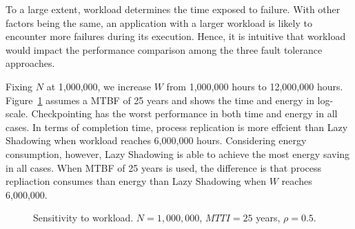 To a large extent, workload determines the time exposed to failure. With other factors being the same, an application with a larger workload is likely to encounter more failures during its execution. Hence, it is intuitive that workload would impact the performance comparison among the three fault tolerance approaches. 

Fixing $N$ at 1,000,000, we increase $W$ from 1,000,000 hours to 12,000,000 hours. Figure~\ref{fig:w25} assumes a MTBF of 25 years and shows the time and energy in log-scale. Checkpointing has the worst performance in both time and energy in all cases. In terms of completion time, process replication is more effcient than Lazy Shadowing when workload reaches 6,000,000 hours. Considering energy consumption, however, Lazy Shadowing is able to achieve the most energy saving in all cases. When MTBF of 25 years is used, the difference is that process repliaction consumes than energy than Lazy Shadowing when $W$ reaches 6,000,000.

\begin{figure}[!h]
	\begin{center}
	\end{center}
	\caption{Sensitivity to workload. $N=1,000,000$, $MTTI=25$ years, $\rho=0.5$.}
	\label{fig:w25}
\end{figure}